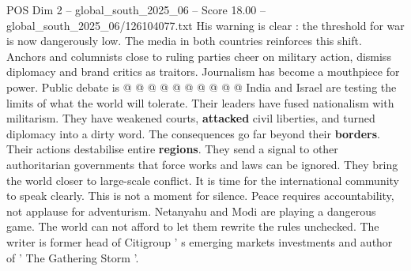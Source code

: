 \begin{textsample}{POS Dim 2 – global\_south\_2025\_06 – Score 18.00 – global\_south\_2025\_06/126104077.txt}
His warning is clear : the threshold for war is now dangerously low.
The media in both countries reinforces this shift.
Anchors and columnists close to ruling parties cheer on military action, dismiss diplomacy and brand critics as traitors.
Journalism has become a mouthpiece for power.
Public debate is @ @ @ @ @ @ @ @ @ @ India and Israel are testing the limits of what the world will tolerate.
Their leaders have fused nationalism with militarism.
They have weakened courts, \textbf{attacked} civil liberties, and turned diplomacy into a dirty word.
The consequences go far beyond their \textbf{borders}.
Their actions destabilise entire \textbf{regions}.
They send a signal to other authoritarian governments that force works and laws can be ignored.
They bring the world closer to large-scale conflict.
It is time for the international community to speak clearly.
This is not a moment for silence.
Peace requires accountability, not applause for adventurism.
Netanyahu and Modi are playing a dangerous game.
The world can not afford to let them rewrite the rules unchecked.
The writer is former head of Citigroup ' s emerging markets investments and author of ' The Gathering Storm '.

\end{textsample}
